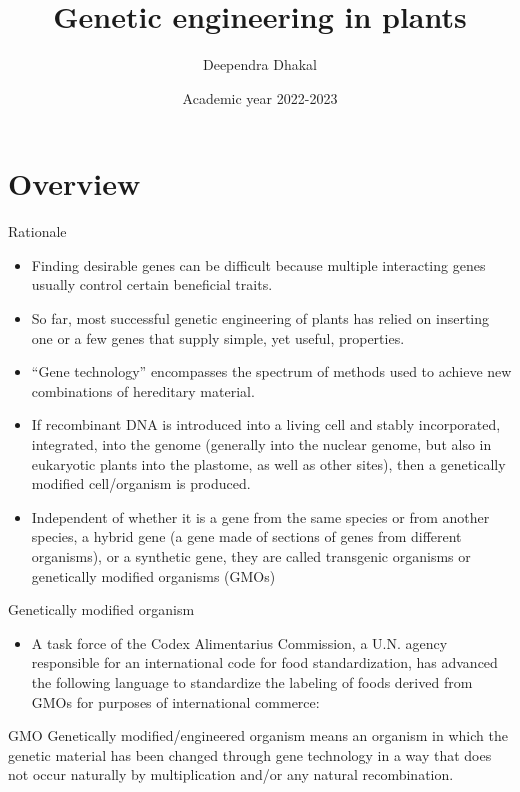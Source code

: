 \documentclass[
  ignorenonframetext,
  aspectratio=169]{beamer}
\title{Genetic engineering in plants}
\author{Deependra Dhakal}
\date{Academic year 2022-2023}
\institute{CNRM, Tikapur \and Agriculture and Forestry University}
\providecommand{\tightlist}{%
  \setlength{\itemsep}{0pt}\setlength{\parskip}{0pt}}
\begin{document}
\frame{\titlepage}

\begin{frame}[allowframebreaks]
  \tableofcontents[hideallsubsections]
\end{frame}
\hypertarget{overview}{%
\section{Overview}\label{overview}}

\begin{frame}{Rationale}
\protect\hypertarget{rationale}{}
\begin{itemize}
\tightlist
\item
  Finding desirable genes can be difficult because multiple interacting
  genes usually control certain beneficial traits.
\item
  So far, most successful genetic engineering of plants has relied on
  inserting one or a few genes that supply simple, yet useful,
  properties.
\item
  ``Gene technology'' encompasses the spectrum of methods used to
  achieve new combinations of hereditary material.
\item
  If recombinant DNA is introduced into a living cell and stably
  incorporated, integrated, into the genome (generally into the nuclear
  genome, but also in eukaryotic plants into the plastome, as well as
  other sites), then a genetically modified cell/organism is produced.
\item
  Independent of whether it is a gene from the same species or from
  another species, a hybrid gene (a gene made of sections of genes from
  different organisms), or a synthetic gene, they are called transgenic
  organisms or genetically modified organisms (GMOs)
\end{itemize}
\end{frame}

\begin{frame}{Genetically modified organism}
\protect\hypertarget{genetically-modified-organism}{}
\begin{itemize}
\tightlist
\item
  A task force of the Codex Alimentarius Commission, a U.N. agency
  responsible for an international code for food standardization, has
  advanced the following language to standardize the labeling of foods
  derived from GMOs for purposes of international commerce:
\end{itemize}

\begin{block}{GMO}
Genetically modified/engineered organism means an organism in which the genetic material has been changed through gene technology in a way that does not occur naturally by multiplication and/or any natural recombination.
\end{block}
\end{frame}
\end{document}

